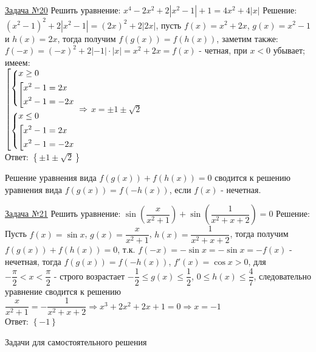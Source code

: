 \documentclass[a4paper,12pt]{article} %
\begin{document}
\label{Problem20}
\underline{Задача №20}
Решить уравнение: $x^4-2x^2+2|x^2-1|+1=4x^2+4|x|$\newline
Решение: $(x^2-1)^2+2|x^2-1|=(2x)^2+2|2x|$, пусть $f(x)=x^2+2x$, $g(x)=x^2-1$ и 
$h(x)=2x$, тогда получим $f(g(x))=f(h(x))$, заметим также: $f(-x)=(-x)^2+2|-1|\cdot|x|=x^2+2x=f(x)$ - 
четная, при $x<0$ убывает; имеем:\\
$	\left[\begin{gathered}
	\begin{dcases}
		x \ge 0 \\
		\left[\begin{gathered}
			x^2-1=2x \hfill \\
			x^2-1=-2x
		\end{gathered}\right.
	\end{dcases}\\
	\begin{dcases}
		x \le 0 \\
		\left[\begin{gathered}
			x^2-1=2x \hfill \\
			x^2-1=-2x
		\end{gathered}\right.
	\end{dcases}	
	\end{gathered}\right. \Rightarrow$
$x=\pm1\pm\sqrt2$\\
Ответ: $\left\{ \pm1\pm\sqrt2 \right\}$

Решение уравнения вида $f(g(x))+f(h(x))=0$ сводится к решению уравнения вида
$f(g(x)) = f(-h(x))$, если $f(x)$ - нечетная.

\label{Problem21}
\underline{Задача №21}
Решить уравнение: $\sin\left( \dfrac{x}{x^2+1} \right) + \sin\left( \dfrac{1}{x^2+x+2} \right) = 0$\newline
Решение: Пусть $f(x)=\sin x$, $g(x)=\dfrac{x}{x^2+1}$, $h(x)=\dfrac{1}{x^2+x+2}$, тогда
получим $f(g(x))+f(h(x))=0$, т.к. $f(-x)=-\sin x=-\sin x=-f(x)$ - нечетная, тогда
$f(g(x)) = f(-h(x))$, $f'(x)=\cos x > 0$, для $-\dfrac{\pi}{2} < x < \dfrac{\pi}{2}$ - строго возрастает
$-\dfrac12 \le g(x) \le \dfrac12$, $0 \le h(x) \le \dfrac47$, следовательно уравнение сводится к решению
$\dfrac{x}{x^2+1}=-\dfrac{1}{x^2+x+2} \Rightarrow x^3+2x^2+2x+1=0 \Rightarrow x=-1$\\
Ответ: $\left\{ -1 \right\}$

\begin{center}
{\large Задачи для самостоятельного решения}
\end{center}
\end{document}
